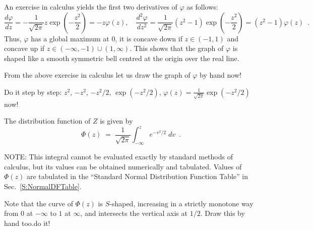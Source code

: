 An exercise in calculus yields the first two derivatives of $\varphi$ as follows:
\[
\frac{d \varphi}{dz} = - \frac{1}{\sqrt{2\pi}}z \exp{\left( -\frac{z^2}{2}\right)}=-z\varphi(z), \quad
\frac{d^2 \varphi}{dz^2} = \frac{1}{\sqrt{2\pi}}(z^2-1) \exp{\left(-\frac{z^2}{2} \right)}=(z^2-1)\varphi(z) \enspace .
\]
Thus, $\varphi$ has a global maximum at $0$, it is concave down if $z \in (-1,1)$ and concave up if $z \in (-\infty,-1) \cup (1,\infty)$.  
This shows that the graph of $\varphi$ is shaped like a smooth symmetric bell centred at the origin over the real line.


\begin{classwork}
From the above exercise in calculus let us draw the graph of $\varphi$ by hand now!

Do it step by step: $z^2$, $-z^2$, $-z^2/2$, $\exp(-z^2/2)$, $\varphi(z) = \frac{1}{\sqrt{2\pi}} \exp(-z^2/2)$ now! 
\vspace*{20mm}
\end{classwork}

The distribution function of $Z$ is given by
\begin{equation}\label{E:StandardNormalDF}
\Phi(z) \;=\;\frac{1}{\sqrt{2\pi}}\int^z_{-\infty}e^{-v^2/2}\;dv \enspace .
\end{equation}

NOTE: {This integral cannot be evaluated exactly by standard methods of calculus, but its values can be
obtained numerically and tabulated.  Values of $\Phi(z)$ are tabulated in the ``Standard Normal Distribution Function Table'' in Sec.~\ref{S:NormalDFTable}.}

\begin{classwork}
{Note that the curve of $\Phi(z)$ is $S$-shaped, increasing in a strictly monotone way from $0$ at $-\infty$ to $1$ at $\infty$, and intersects the vertical axis at $1/2$. Draw this by hand too.}{}{do it! \vspace*{20mm}}
\end{classwork}

